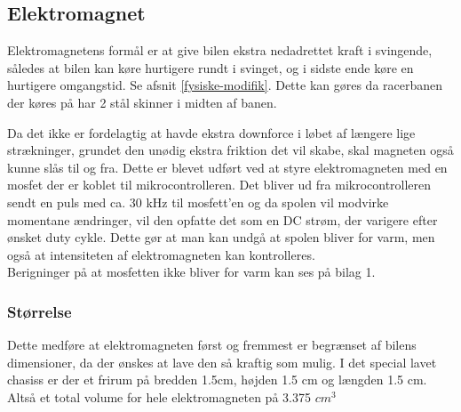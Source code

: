 
\subsection{Elektromagnet}
\label{Elektromagnet}


Elektromagnetens formål er at give bilen ekstra nedadrettet kraft i svingende, således at bilen kan køre hurtigere rundt i svinget, og i sidste ende køre en hurtigere omgangstid. Se afsnit \ref{fysiske-modifik}. Dette kan gøres da racerbanen der køres på har 2 stål skinner i midten af banen.

Da det ikke er fordelagtig at havde ekstra downforce i løbet af længere lige strækninger, grundet den unødig ekstra friktion det vil skabe, skal magneten også kunne slås til og fra. Dette er blevet udført ved at styre elektromagneten med en mosfet der er koblet til mikrocontrolleren. Det bliver ud fra mikrocontrolleren sendt en puls med ca. 30 kHz til mosfett’en og da spolen vil modvirke momentane ændringer, vil den opfatte det som en DC strøm, der varigere efter ønsket duty cykle. Dette gør at man kan undgå at spolen bliver for varm, men også at intensiteten af elektromagneten kan kontrolleres. \\
Berigninger på at mosfetten ikke bliver for varm kan ses på bilag 1.

\subsubsection{Størrelse}

Dette medføre at elektromagneten først og fremmest er begrænset af bilens dimensioner, da der ønskes at lave den så kraftig som mulig. I det special lavet chasiss er der et frirum på bredden 1.5cm, højden 1.5 cm og længden 1.5 cm. Altså et total volume for hele elektromagneten på 3.375 $cm^3$

